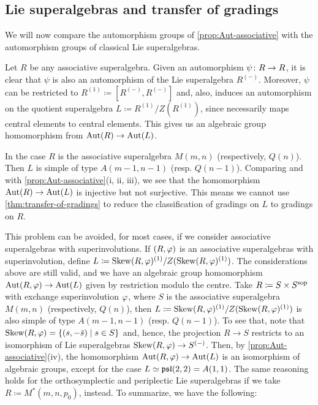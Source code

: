 \subsection{Lie superalgebras and transfer of gradings}

We will now compare the automorphism groups of \cref{prop:Aut-associative} with the automorphism groups of classical Lie superalgebras. 

Let $R$ be any associative superalgebra. 
Given an automorphism $\psi\colon R \to R$, it is clear that $\psi$ is also an automorphism of the Lie superalgebra $R^{(-)}$. 
Moreover, $\psi$ can be restricted to $R^{(1)} \coloneqq [ R^{(-)}, R^{(-)} ]$ and, also, induces an automorphism on the quotient superalgebra $L \coloneqq R^{(1)}/Z(R^{(1)})$, since necessarily maps central elements to central elements. 
This gives us an algebraic group homomorphism from $\operatorname{Aut}(R) \to \operatorname{Aut}(L)$. 

In the case $R$ is the associative superalgebra $M(m,n)$ (respectively, $Q(n)$). 
Then $L$ is simple of type $A(m-1, n-1)$ (resp. $Q(n-1)$). 
Comparing \cite[Theorem 1]{serganova} and \cite[Theorem 4.1]{Pianzola} with \cref{prop:Aut-associative}(i, ii, iii), we see that the homomorphism $\operatorname{Aut}(R) \to \operatorname{Aut}(L)$ is injective but not surjective. 
This means we cannot use \cref{thm:transfer-of-gradings} to reduce the classification of gradings on $L$ to gradings on $R$. 

This problem can be avoided, for most cases, if we consider associative superalgebras with superinvolutions. 
If $(R, \varphi)$ is an associative superalgebras with superinvolution, define $L \coloneqq \operatorname{Skew}(R, \varphi)^{(1)}/Z( \operatorname{Skew}(R, \varphi)^{(1)} )$. 
The considerations above are still valid, and we have an algebraic group homomorphism $\operatorname{Aut}(R, \varphi) \to \operatorname{Aut}(L)$ given by restriction modulo the centre. 
Take $R \coloneqq S\times S^{\mathrm{sop}}$ with exchange superinvolution $\varphi$, where $S$ is the associative superalgebra $M(m,n)$ (respectively, $Q(n)$), then $L \coloneqq \operatorname{Skew}(R, \varphi)^{(1)}/Z( \operatorname{Skew}(R, \varphi)^{(1)} )$ is also simple of type $A(m-1, n-1)$ (resp. $Q(n-1)$). 
To see that, note that $\operatorname{Skew}(R, \varphi) = \{ (s, -\bar s) \mid s\in S \}$ and, hence, the projection $R \to S$ restricts to an isomorphism of Lie superalgebras $\operatorname{Skew}(R, \varphi) \to S^{(-)}$. 
Then, by \cref{prop:Aut-associative}(iv), the homomorphism $\operatorname{Aut}(R, \varphi) \to \operatorname{Aut}(L)$ is an isomorphism of algebraic groups, except for the case $L \simeq \mathfrak{psl}(2,2) = A(1,1)$. 
The same reasoning holds for the orthosymplectic and periplectic Lie superalgebras if we take $R \coloneqq M^*(m, n, p_0)$, instead. 
To summarize, we have the following:

